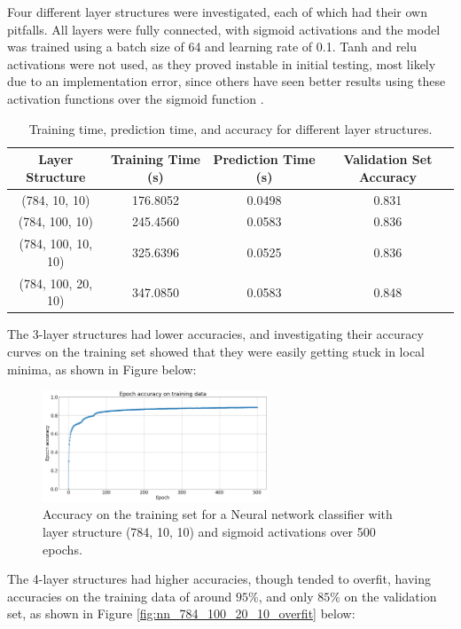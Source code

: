 \documentclass[11pt,a4paper]{article}
\begin{document}
\noindent Four different layer structures were investigated, each of which had their own pitfalls. All layers were fully connected, with sigmoid activations and the model was trained using a batch size of 64 and learning rate of 0.1. Tanh and relu activations were not used, as they proved instable in initial testing, most likely due to an implementation error, since others have seen better results using these activation functions over the sigmoid function \cite{xiao2017/online}.

\begin{table}[H]
\centering
\begin{tabular}{|c|c c c|} 
\hline
Layer Structure & Training Time (s) & Prediction Time (s) & Validation Set Accuracy \\ [0.5ex] 
\hline
(784, 10, 10) & 176.8052 & 0.0498 & 0.831 \\ 
(784, 100, 10) & 245.4560 & 0.0583 & 0.836 \\
(784, 100, 10, 10) & 325.6396 & 0.0525 & 0.836\\
(784, 100, 20, 10) & 347.0850 & 0.0583 & 0.848 \\ [1ex] 
\hline
\end{tabular}
\caption{Training time, prediction time, and accuracy for different layer structures.}
\label{table:nn_sigmoid_layer_structure}
\end{table}

\noindent The 3-layer structures had lower accuracies, and investigating their accuracy curves on the training set showed that they were easily getting stuck in local minima, as shown in Figure below:

\begin{figure}[H]
    \centering
    \includegraphics[width=0.6\textwidth]{img/local_minima.png}
    \caption{Accuracy on the training set for a Neural network classifier with layer structure (784, 10, 10) and sigmoid activations over 500 epochs.}
    \label{fig:nn_local_minima}
\end{figure}

\noindent The 4-layer structures had higher accuracies, though tended to overfit, having accuracies on the training data of around $95\%$, and only $85\%$ on the validation set, as shown in Figure \ref{fig:nn_784_100_20_10_overfit} below:
\end{document}

